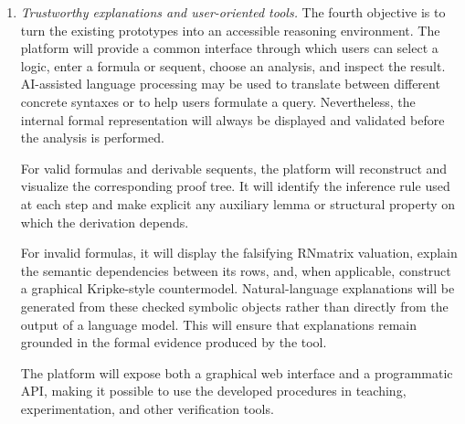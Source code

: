 \documentclass[a4paper]{article}
\begin{document}
\begin{enumerate}
The scientific goal is not merely to automate programming tasks, but to develop a systematic and reusable methodology for learning which symbolic representation is best suited to a given reasoning problem.

\item {\em Trustworthy explanations and user-oriented tools.}
The fourth objective is to turn the existing prototypes into an accessible reasoning environment.
%
The platform will provide a common interface through which users can select a logic, enter a formula or sequent, choose an analysis, and inspect the result. AI-assisted language processing may be used to translate between different concrete syntaxes or to help users formulate a query. Nevertheless, the internal formal representation will always be displayed and validated before the analysis is performed.

For valid formulas and derivable sequents, the platform will reconstruct and visualize the corresponding proof tree. It will identify the inference rule used at each step and make explicit any auxiliary lemma or structural property on which the derivation depends.

For invalid formulas, it will display the falsifying RNmatrix valuation, explain the semantic dependencies between its rows, and, when applicable, construct a graphical Kripke-style countermodel. Natural-language explanations will be generated from these checked symbolic objects rather than directly from the output of a language model. This will ensure that explanations remain grounded in the formal evidence produced by the tool.

The platform will expose both a graphical web interface and a programmatic API, making it possible to use the developed procedures in teaching, experimentation, and other verification tools.
\end{enumerate}
\end{document}
